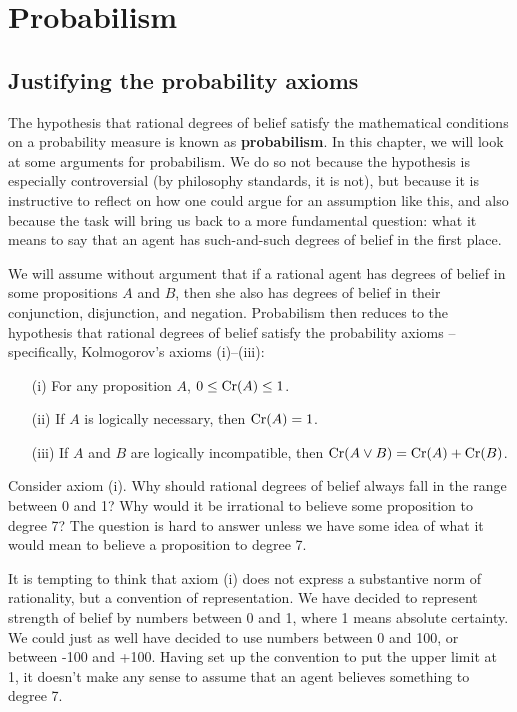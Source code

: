\chapter{Probabilism}\label{ch:probabilism}

\section{Justifying the probability axioms}

The hypothesis that rational degrees of belief satisfy the
mathematical conditions on a probability measure is known as
\textbf{probabilism}. In this chapter, we will look at some arguments
for probabilism. We do so not because the hypothesis is especially
controversial (by philosophy standards, it is not), but because it is
instructive to reflect on how one could argue for an assumption like
this, and also because the task will bring us back to a more
fundamental question: what it means to say that an agent has
such-and-such degrees of belief in the first place.

We will assume without argument that if a rational agent has degrees
of belief in some propositions $A$ and $B$, then she also has degrees
of belief in their conjunction, disjunction, and negation. Probabilism
then reduces to the hypothesis that rational degrees of belief satisfy
the probability axioms -- specifically, Kolmogorov's axioms (i)--(iii):
\begin{itemize}
\itemsep0em 
\item[(i)] For any proposition $A$, $0 \leq \text{Cr}(A) \leq 1$.
\item[(ii)] If $A$ is logically necessary, then $\text{Cr}(A) = 1$.
\item[(iii)] If $A$ and $B$ are logically incompatible, then $\text{Cr}(A \lor B) = \text{Cr}(A) + \text{Cr}(B)$.
\end{itemize}

Consider axiom (i). Why should rational degrees of belief always fall
in the range between 0 and 1? Why would it be irrational to believe
some proposition to degree 7? The question is hard to answer unless we
have some idea of what it would mean to believe a proposition to
degree 7.

It is tempting to think that axiom (i) does not express a substantive
norm of rationality, but a convention of representation. We have
decided to represent strength of belief by numbers between 0 and 1,
where 1 means absolute certainty. We could just as well have decided
to use numbers between 0 and 100, or between -100 and +100. Having set
up the convention to put the upper limit at 1, it doesn't make any
sense to assume that an agent believes something to degree 7.

